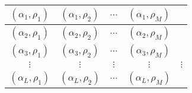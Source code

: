 \documentclass{standalone}
\begin{document}
  \begin{tabular}{ c | c | c | c | c  }
    \hline
    $(\alpha_1, \rho_1)$ & $(\alpha_1, \rho_2)$
    & $\ldots$ & $(\alpha_1, \rho_M)$ \\ \hline
    $(\alpha_2, \rho_1)$ & $(\alpha_2, \rho_2)$
    & $\ldots$ & $(\alpha_2, \rho_M)$ \\ \hline
    $(\alpha_3, \rho_1)$ & $(\alpha_3, \rho_2)$
    & $\ldots$ & $(\alpha_3, \rho_M)$ \\ \hline
    $\vdots$ & $\vdots$ & $\vdots$ & $\vdots$ & $\vdots$ \\ \hline
    $(\alpha_L, \rho_1)$ & $(\alpha_L, \rho_2)$
    & $\ldots$ & $(\alpha_L, \rho_M)$ \\ \hline
  \end{tabular}
\end{document}

